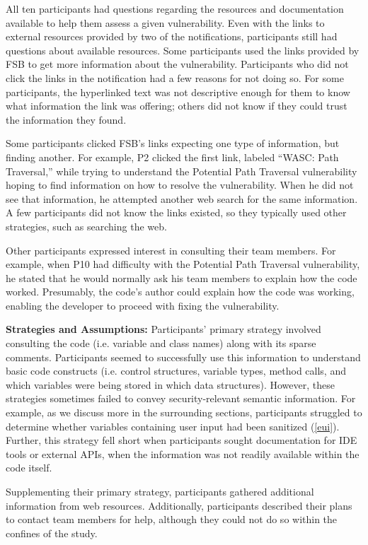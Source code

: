 \documentclass[10pt,journal,compsoc]{IEEEtran}
\begin{document}
All ten participants had questions regarding the resources and documentation available to help them assess a given vulnerability. 
Even with the links to external resources provided by two of the notifications, participants still had questions about available resources. 
Some participants used the links provided by FSB to get more information about the vulnerability.
Participants who did not click the links in the notification had a few reasons for not doing so.
For some participants, the hyperlinked text was not descriptive enough for them to know what information the link was offering; others did not know if they could trust the information they found.

Some participants clicked FSB's links expecting one type of information, but finding another. 
For example, P2 clicked the first link, labeled ``WASC: Path Traversal,'' while trying to understand the Potential Path Traversal vulnerability hoping to find information on how to resolve the vulnerability.
When he did not see that information, he attempted another web search for the same information. 
A few participants did not know the links existed, so they typically used other strategies, such as searching the web.

Other participants expressed interest in consulting their team members. 
For example, when P10 had difficulty with the Potential Path Traversal vulnerability, he stated that he would normally ask his team members to explain how the code worked.
Presumably, the code's author could explain how the code was working, enabling the developer to proceed with fixing the vulnerability.


\textbf{Strategies and Assumptions:}
Participants' primary strategy involved consulting the code (i.e. variable and class names) along with its sparse comments.
Participants seemed to successfully use this information to understand basic code constructs (i.e. control structures, variable types, method calls, and which variables were being stored in which data structures).
However, these strategies sometimes failed to convey security-relevant semantic information. 
For example, as we discuss more in the surrounding sections, participants struggled to determine whether variables containing user input had been sanitized (\ref{eui}). 
Further, this strategy fell short when participants sought documentation for IDE tools or external APIs, when the information was not readily available within the code itself. 

Supplementing their primary strategy, participants gathered additional information from web resources.
Additionally, participants described their plans to contact team members for help, although they could not do so within the confines of the study.
\end{document}
